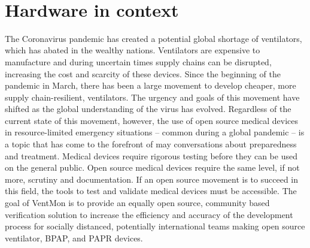 \documentclass[11pt, letterpaper]{article}
\begin{document}
\begin{flushleft}
\begin{tabu}
\\\hline
\end{tabu}
\end{flushleft}

\section{Hardware in context}
The Coronavirus pandemic has created a potential global shortage of ventilators\cite{pearce2020review}, which has abated in the wealthy nations. Ventilators are expensive to manufacture and during uncertain times supply chains can be disrupted, increasing the cost and scarcity of these devices. Since the beginning of the pandemic in March, there has been a large movement to develop cheaper, more supply chain-resilient, ventilators. The urgency and goals of this movement have shifted as the global understanding of the virus has evolved. Regardless of the current state of this movement, however, the use of open source medical devices in resource-limited emergency situations -- common during a global pandemic -- is a topic that has come to the forefront of may conversations about preparedness and treatment. Medical devices require rigorous testing before they can be used on the general public. Open source medical devices require the same level, if not more, scrutiny and documentation. If an open source movement is to succeed in this field, the tools to test and validate medical devices must be accessible. The goal of VentMon is to provide an equally open source, community based verification solution to increase the efficiency and accuracy of the development process for socially distanced, potentially international teams making open source ventilator, BPAP, and PAPR devices.
\end{document}
